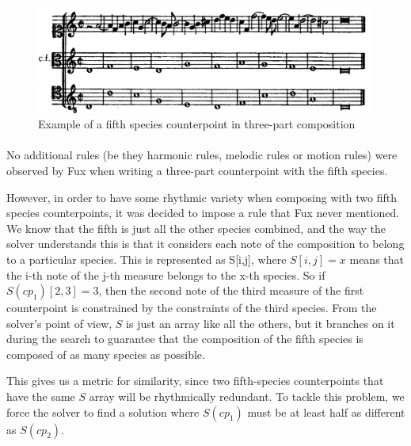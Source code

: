 \begin{figure}[h]
    \centering
    \includegraphics[width=1\textwidth]{Images/Species_examples/5sp-example.png}
    \caption{Example of a fifth species counterpoint in three-part composition}
    \label{fig:example-5sp}
\end{figure}

\paragraph{}
No additional rules (be they harmonic rules, melodic rules or motion rules) were observed by Fux when writing a three-part counterpoint with the fifth species.


However, in order to have some rhythmic variety when composing with two fifth species counterpoints, it was decided to impose a rule that Fux never mentioned. We know that the fifth is just all the other species combined, and the way the solver understands this is that it considers each note of the composition to belong to a particular species. This is represented as S[i,j], where $S[i,j]=x$ means that the i-th note of the j-th measure belongs to the x-th species. So if $S(cp_1)[2, 3]=3$, then the second note of the third measure of the first counterpoint is constrained by the constraints of the third species. From the solver's point of view, $S$ is just an array like all the others, but it branches on it during the search to guarantee that the composition of the fifth species is composed of as many species as possible.

This gives us a metric for similarity, since two fifth-species counterpoints that have the same $S$ array will be rhythmically redundant. To tackle this problem, we force the solver to find a solution where $S(cp_1)$ must be at least half as different as $S(cp_2)$. 

